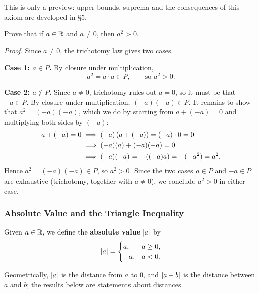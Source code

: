 This is only a preview: upper bounds, suprema and the consequences of this axiom are developed in \S5.


\begin{example}
    Prove that if $a \in \mathbb{R}$ and $a \neq 0$, then $a^2 > 0$.
\end{example}

\begin{proof}
    Since $a \neq 0$, the trichotomy law gives two cases.

    \textbf{Case 1: $a \in P$.} By closure under multiplication,
    \begin{equation*}
        a^2 = a \cdot a \in P, \qquad\text{so } a^2 > 0.
    \end{equation*}

    \textbf{Case 2: $a \notin P$.} Since $a \neq 0$, trichotomy rules out $a=0$,
    so it must be that $-a \in P$. By closure under multiplication,
    $(-a)(-a) \in P$. It remains to show that $a^2 = (-a)(-a)$, which we do by
    starting from $a + (-a) = 0$ and multiplying both sides by $(-a)$:
    \begin{align*}
        a + (-a) = 0
            &\implies (-a)\left(a + (-a)\right) = (-a) \cdot 0 = 0 \\
            &\implies (-a)(a) + (-a)(-a) = 0 \\
            &\implies (-a)(-a) = -\left((-a)a\right) = -(-a^2) = a^2.
    \end{align*}
    Hence $a^2 = (-a)(-a) \in P$, so $a^2 > 0$. Since the two cases $a \in P$
    and $-a \in P$ are exhaustive (trichotomy, together with $a \neq 0$), we
    conclude $a^2 > 0$ in either case.
\end{proof}

\subsubsection{Absolute Value and the Triangle Inequality}
\begin{definition}\label{def:absolute-value}
    Given $a \in \mathbb{R}$, we define the \textbf{absolute value} $\left|a\right|$ by
    \[
        \left|a\right| =
        \begin{cases}
            a, & a \geq 0, \\
            -a, & a < 0.
        \end{cases}
    \]
\end{definition}

Geometrically, $\left|a\right|$ is the distance from $a$ to $0$, and $\left|a-b\right|$ is the distance between $a$ and $b$; the results below are statements about distances.


